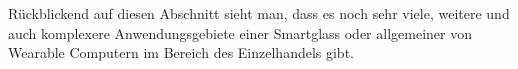 Rückblickend auf diesen Abschnitt sieht man, dass es noch sehr viele, weitere und auch komplexere Anwendungsgebiete einer Smartglass oder allgemeiner von Wearable Computern im Bereich des Einzelhandels gibt. 
%


